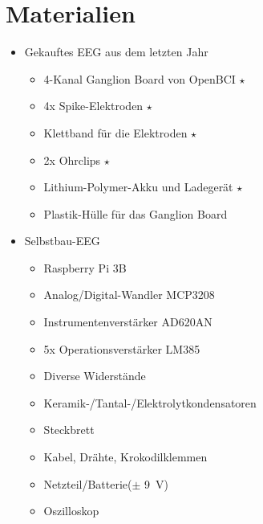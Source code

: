 \documentclass[10pt]{article}
\begin{document}
\newpage %

\section{Materialien} 

\begin{itemize}
    
    \item Gekauftes EEG aus dem letzten Jahr %
        \vspace*{-2ex}
        \begin{multicols}{2} %
        \begin{itemize} %
            \item 4-Kanal Ganglion Board von OpenBCI $\star$
            \item 4x Spike-Elektroden $\star$
            \item Klettband für die Elektroden $\star$
            \item 2x Ohrclips $\star$
            \item Lithium-Polymer-Akku und Ladegerät $\star$
            \item Plastik-Hülle für das Ganglion Board
        \end{itemize}
        \end{multicols}
        \vspace*{-2ex}
    \item Selbstbau-EEG
        \vspace*{-2ex}
        \begin{multicols}{2}
        \begin{itemize}
            \item Raspberry Pi 3B
            \item Analog/Digital-Wandler MCP3208
            \item Instrumentenverstärker AD620AN
            \item 5x Operationsverstärker LM385
            \item Diverse Widerstände
            \item Keramik-/Tantal-/Elektrolytkondensatoren %
            \item Steckbrett
            \item Kabel, Drähte, Krokodilklemmen
            \item Netzteil/Batterie($\pm$ \SI{9}{\volt})
            \item Oszilloskop

\end{itemize}
\end{multicols}
\end{itemize}
\end{document}
